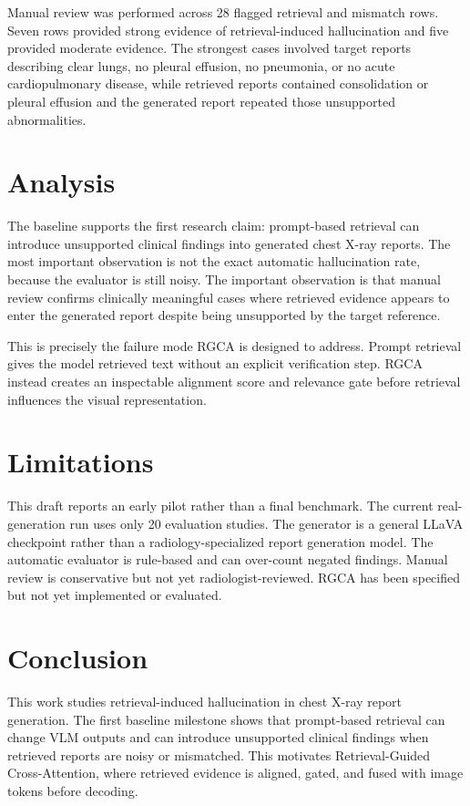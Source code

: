 \documentclass[11pt]{article}
\begin{document}
Manual review was performed across 28 flagged retrieval and mismatch rows. Seven rows provided strong evidence of retrieval-induced hallucination and five provided moderate evidence. The strongest cases involved target reports describing clear lungs, no pleural effusion, no pneumonia, or no acute cardiopulmonary disease, while retrieved reports contained consolidation or pleural effusion and the generated report repeated those unsupported abnormalities.

\section{Analysis}

The baseline supports the first research claim: prompt-based retrieval can introduce unsupported clinical findings into generated chest X-ray reports. The most important observation is not the exact automatic hallucination rate, because the evaluator is still noisy. The important observation is that manual review confirms clinically meaningful cases where retrieved evidence appears to enter the generated report despite being unsupported by the target reference.

This is precisely the failure mode RGCA is designed to address. Prompt retrieval gives the model retrieved text without an explicit verification step. RGCA instead creates an inspectable alignment score and relevance gate before retrieval influences the visual representation.

\section{Limitations}

This draft reports an early pilot rather than a final benchmark. The current real-generation run uses only 20 evaluation studies. The generator is a general LLaVA checkpoint rather than a radiology-specialized report generation model. The automatic evaluator is rule-based and can over-count negated findings. Manual review is conservative but not yet radiologist-reviewed. RGCA has been specified but not yet implemented or evaluated.

\section{Conclusion}

This work studies retrieval-induced hallucination in chest X-ray report generation. The first baseline milestone shows that prompt-based retrieval can change VLM outputs and can introduce unsupported clinical findings when retrieved reports are noisy or mismatched. This motivates Retrieval-Guided Cross-Attention, where retrieved evidence is aligned, gated, and fused with image tokens before decoding.
\end{document}

